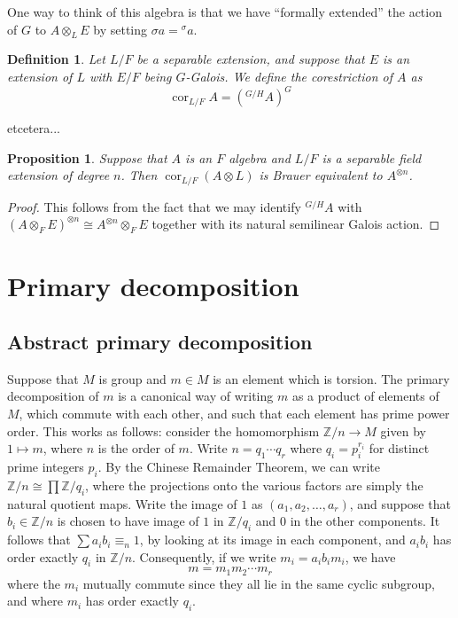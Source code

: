 \documentclass[12pt]{report}
\theoremstyle{plain}
\newtheorem{defn}[thm]{Definition}
\newtheorem{prop}[thm]{Proposition}
\newcommand{\oper}[1]{\operatorname{#1}}
\newcommand{\ZZ}{\mathbb{Z}}
\newcommand{\cores}{\oper{cor}}
\newcommand{\X}[1]{#1\index{#1}}
\newcommand{\todo}[1]{\textcolor{todo}{#1}}
\begin{document}
One way to think of this algebra is that we have ``formally extended'' the
action of $G$ to $A \otimes_L E$ by setting $\sigma a = {}^\sigma a$.

\begin{defn}
Let $L/F$ be a separable extension, and suppose that $E$ is an extension of
$L$ with $E/F$ being $G$-Galois. We define the corestriction of $A$ as
\[\cores_{L/F} A  = ({}^{G/H} A)^G \]
\end{defn}

\todo{etcetera...}

\begin{prop}
Suppose that $A$ is an $F$ algebra and $L/F$ is a separable field extension
of degree $n$. Then $\cores_{L/F}(A \otimes L)$ is Brauer equivalent to
$A^{\otimes n}$.
\end{prop}
\begin{proof}
This follows from the fact that we may identify $^{G/H} A$ with $(A
\otimes_F E)^{\otimes n} \cong A^{\otimes n} \otimes_{F} E$ together with
its natural semilinear Galois action.
\end{proof}

\section{Primary decomposition}

\subsection{Abstract primary decomposition}

Suppose that $M$ is group and $m \in M$ is an element which is torsion. The
\X{primary decomposition} of $m$ is a canonical way of writing $m$ as a
product of elements of $M$, which commute with each other, and such that
each element has prime power order. This works as follows: consider the
homomorphism $\mathbb Z/n \to M$ given by $1 \mapsto m$, where $n$ is the
order of $m$. Write $n = q_1 \cdots q_r$
where $q_i = p_i^{r_i}$ for distinct prime integers $p_i$. By the Chinese
Remainder Theorem, we can write $\ZZ/n \cong \prod \ZZ/q_i$, where the
projections onto the various factors are simply the natural quotient maps.
Write the image of $1$ as $(a_1, a_2, \ldots, a_r)$, and suppose
that $b_i \in \ZZ/n$ is chosen to have image of $1$ in $\ZZ/q_i$ and $0$
in the other components. It follows that $\sum a_i b_i \equiv_n 1$, by
looking at its image in each component, and $a_i b_i$ has order exactly
$q_i$ in $\ZZ/n$. Consequently, if we write $m_i = a_i b_i m_i$, we have
\[m = m_1 m_2 \cdots m_r\]
where the $m_i$ mutually commute since they all lie in the same cyclic
subgroup, and where $m_i$ has order exactly $q_i$.
\end{document}
